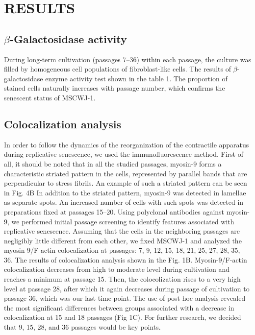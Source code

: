 \documentclass[alpha-refs]{wiley-article}
\begin{document}
\section{RESULTS}

\subsection{$\beta$-Galactosidase activity}

During long-term cultivation (passages 7--36) within each passage, the culture was filled by homogeneous cell populations of fibroblast-like cells.
The results of $\beta$-galactosidase enzyme activity test shown in the table 1.
The proportion of stained cells naturally increases with passage number, which confirms the senescent status of MSCWJ-1.

\subsection{Colocalization analysis}

In order to follow the dynamics of the reorganization of the contractile apparatus during replicative senescence, we used the immunofluorescence method.
First of all, it should be noted that in all the studied passages, myosin-9 forms a characteristic striated pattern in the cells, represented by parallel bands that are perpendicular to stress fibrils.
An example of such a striated pattern can be seen in Fig. 4B
In addition to the striated pattern, myosin-9 was detected in lamellae as separate spots.
An increased number of cells with such spots was detected in preparations fixed at passages 15--20.
Using polyclonal antibodies against myosin-9, we performed initial passage screening to identify features associated with replicative senescence.
Assuming that the cells in the neighboring passages are negligibly little different from each other, we fixed MSCWJ-1 and analyzed the myosin-9/F-actin colocalization at passages: 7, 9, 12, 15, 18, 21, 25, 27, 28, 35, 36.
The results of colocalization analysis shown in the Fig. 1B.
Myosin-9/F-actin colocalization decreases from high to moderate level during cultivation and reaches a minimum at passage 15.
Then, the colocolization rises to a very high level at passage 28, after which it again decreases during passage of cultivation to passage 36, which was our last time point.
The use of post hoc analysis revealed the most significant differences between groups associated with a decrease in colocalization at 15 and 18 passages (Fig 1C).
For further research, we decided that 9, 15, 28, and 36 passages would be key points.
\end{document}
